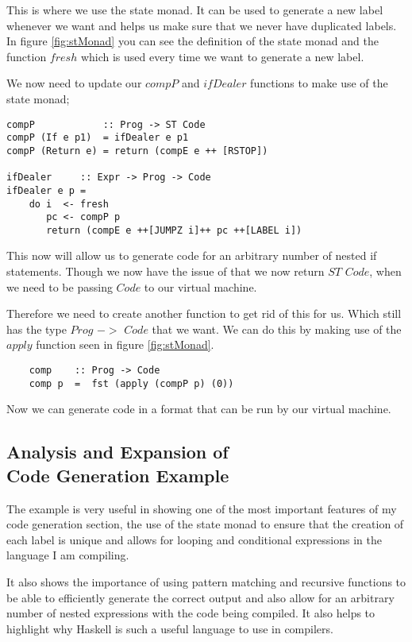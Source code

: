 This is where we use the state monad. It can be used to generate a new label whenever we want and helps us make sure that we never have duplicated labels. In figure \ref{fig:stMonad} you can see the definition of the state monad and the function $fresh$ which is used every time we want to generate a new label. 

We now need to update our $compP$ and $ifDealer$ functions to make use of the state monad;

\begin{lstlisting}
compP            :: Prog -> ST Code 
compP (If e p1)  = ifDealer e p1  
compP (Return e) = return (compE e ++ [RSTOP])
	
ifDealer     :: Expr -> Prog -> Code 
ifDealer e p = 
	do i  <- fresh
	   pc <- compP p
	   return (compE e ++[JUMPZ i]++ pc ++[LABEL i])
\end{lstlisting}

This now will allow us to generate code for an arbitrary number of nested if statements. Though we now have the issue of that we now return $ST$ $Code$, when we need to be passing $Code$ to our virtual machine. 

Therefore we need to create another function to get rid of this for us. Which still has the type $Prog$ $->$ $Code$ that we want. We can do this by making use of the $apply$ function seen in figure \ref{fig:stMonad}.

\begin{lstlisting}
	comp    :: Prog -> Code
	comp p  =  fst (apply (compP p) (0))
\end{lstlisting}    

Now we can generate code in a format that can be run by our virtual machine.

\subsection[Analysis and Expansion of Code Generation Example]{Analysis and Expansion of \\ Code Generation Example}

The example is very useful in showing one of the most important features of my code generation section, the use of the state monad to ensure that the creation of each label is unique and allows for looping and conditional expressions in the language I am compiling.

It also shows the importance of using pattern matching and recursive functions to be able to efficiently generate the correct output and also allow for an arbitrary number of nested expressions with the code being compiled. It also helps to highlight why Haskell is such a useful language to use in compilers.

